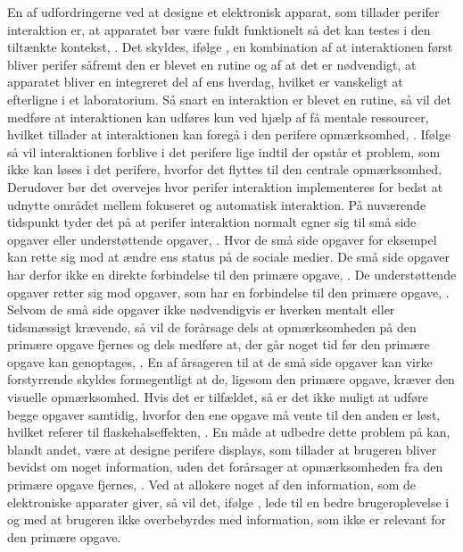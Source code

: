 En af udfordringerne ved at designe et elektronisk apparat, som tillader perifer interaktion er, at apparatet bør være fuldt funktionelt så det kan testes i den tiltænkte kontekst, \parencite[s. 21]{PDF:EvaluatingPI}. Det skyldes, ifølge \textcite[s. 22]{PDF:EvaluatingPI}, en kombination af at interaktionen først bliver perifer såfremt den er blevet en rutine og af at det er nødvendigt, at apparatet bliver en integreret del af ens hverdag, hvilket er vanskeligt at efterligne i et laboratorium. Så snart en interaktion er blevet en rutine, så vil det medføre at interaktionen kan udføres kun ved hjælp af få mentale ressourcer, hvilket tillader at interaktionen kan foregå i den perifere opmærksomhed, \parencite[s. 2]{PDF:FacilitatingPIDesignAndEvaluation}. Ifølge \textcite[s. 14]{PDF:PeripheralInteraction} så vil interaktionen forblive i det perifere lige indtil der opstår et problem, som ikke kan løses i det perifere, hvorfor det flyttes til den centrale opmærksomhed. \blankline 
%
Derudover bør det overvejes hvor perifer interaktion implementeres for bedst at udnytte området mellem fokuseret og automatisk interaktion. På nuværende tidspunkt tyder det på at perifer interaktion normalt egner sig til små side opgaver eller understøttende opgaver, \parencite[s. 21]{PDF:EvaluatingPI}. Hvor de små side opgaver for eksempel kan rette sig mod at ændre ens status på de sociale medier. De små side opgaver har derfor ikke en direkte forbindelse til den primære opgave, \parencite[s. 162]{PDF:ComparingInputModalities}. De understøttende opgaver retter sig mod opgaver, som har en forbindelse til den primære opgave, \parencite[s. 21]{PDF:EvaluatingPI}. Selvom de små side opgaver ikke nødvendigvis er hverken mentalt eller tidsmæssigt krævende, så vil de forårsage dels at opmærksomheden på den primære opgave fjernes og dels medføre at, der går noget tid før den primære opgave kan genoptages, \parencite[s. 162]{PDF:ComparingInputModalities}. En af årsageren til at de små side opgaver kan virke forstyrrende skyldes formegentligt at de, ligesom den primære opgave, kræver den visuelle opmærksomhed. Hvis det er tilfældet, så er det ikke muligt at udføre begge opgaver samtidig, hvorfor den ene opgave må vente til den anden er løst, hvilket referer til flaskehalseffekten, \parencite[s. 240]{PDF:PICharacteristicsAndConsiderations}. En måde at udbedre dette problem på kan, blandt andet, være at designe perifere displays, som tillader at brugeren bliver bevidst om noget information, uden det forårsager at opmærksomheden fra den primære opgave fjernes, \parencite[s. 247]{PDF:AToolkitForManaging}. Ved at allokere noget af den information, som de elektroniske apparater giver, så vil det, ifølge \textcite[s. 55]{PDF:PeripheralInteraction}, lede til en bedre brugeroplevelse i og med at brugeren ikke overbebyrdes med information, som ikke er relevant for den primære opgave. 

